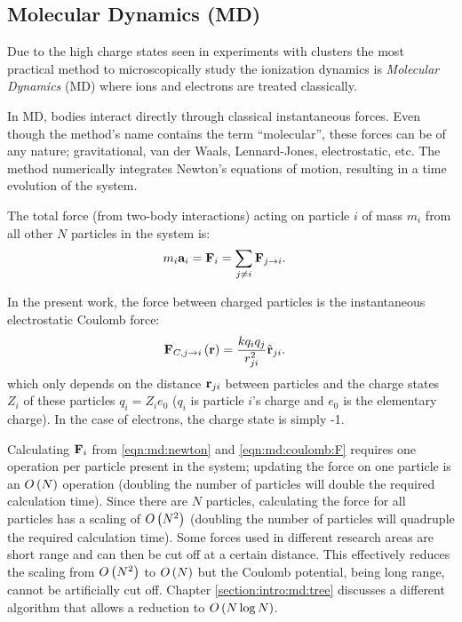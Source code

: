 \subsection{Molecular Dynamics (MD)}
\label{section:tools:md}

Due to the high charge states seen in experiments with clusters the most
practical method to microscopically study the ionization dynamics is
\textit{Molecular Dynamics} (MD) where ions and electrons are treated
classically.

In MD, bodies interact directly through classical instantaneous forces. Even
though the method's name contains the term ``molecular'', these forces can be
of any nature; gravitational, van der Waals, Lennard-Jones, electrostatic, etc.
The method numerically integrates Newton's equations of motion, resulting in a
time evolution of the system.

The total force (from two-body interactions) acting on particle $i$ of mass
$m_i$ from all other $N$ particles in the system is:
\begin{align}
m_i \textbf{a}_i & = \textbf{F}_i = \sum_{j \ne i} \textbf{F}_{j \rightarrow i}.
\label{eqn:md:newton}
\end{align}

In the present work, the force between charged particles is the instantaneous
electrostatic Coulomb force:
\begin{align}
\textbf{F}_{C,j \rightarrow i}\left( \textbf{r} \right) & =\frac{k q_i q_j}{r_{ji}^2} \hat{\textbf{r}}_{ji}.
\label{eqn:md:coulomb:F}
\end{align}
which only depends on the distance $\textbf{r}_{ji}$ between particles and the charge
states $Z_i$ of these particles $q_i = Z_i e_0$ ($q_i$ is particle $i$'s charge
and $e_0$ is the elementary charge). In the case of electrons, the charge
state is simply -1.

Calculating $\textbf{F}_i$
from \eqref{eqn:md:newton} and \eqref{eqn:md:coulomb:F} requires one operation
per particle present in the system; updating the force on one particle is an
$O\left( N \right)$ operation (doubling the number of particles will double the required
calculation time). Since there are $N$ particles, calculating the force for
all particles has a scaling of $O\left( N^2 \right)$ (doubling the number of
particles will quadruple the required calculation time). Some forces used in
different research areas are short range and can then be cut off at a certain
distance. This effectively reduces the scaling from $O\left( N^2 \right)$ to $O\left( N \right)$
but the Coulomb potential, being long range, cannot be artificially cut off.
Chapter \ref{section:intro:md:tree} discusses a different algorithm that allows
a reduction to $O\left( N \log{N} \right)$.


